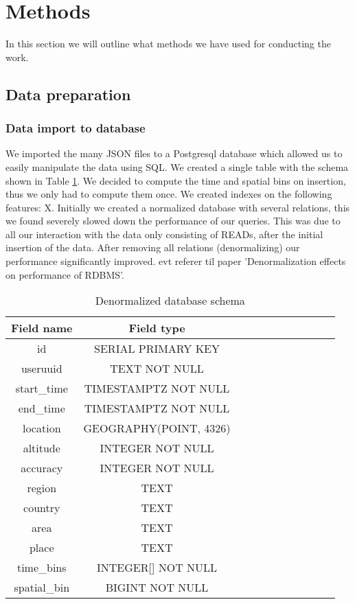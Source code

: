 \section{Methods}
In this section we will outline what methods we have used for conducting the work.
\subsection{Data preparation}
\subsubsection{Data import to database}
We imported the many JSON files to a Postgresql database which allowed us to easily manipulate the data using SQL. We created a single table with the schema shown in Table \ref{table:schema_denormalized}. We decided to compute the time and spatial bins on insertion, thus we only had to compute them once. We created indexes on the following features: X.
Initially we created a normalized database with several relations, this we found severely slowed down the performance of our queries. This was due to all our interaction with the data only consisting of READs, after the initial insertion of the data. After removing all relations (denormalizing) our performance significantly improved. {\color{red} evt referer til paper 'Denormalization effects on performance of RDBMS'}.
\begin{table}[htbp]
\centering

\begin{tabular}{|c|c|c|c|c|c|c|c|c|c|c|}
\hline
\textbf{Field name} & \textbf{Field type}    \\
\hline
id                  & SERIAL PRIMARY KEY     \\
\hline
useruuid            & TEXT NOT NULL          \\
\hline
start\_time         & TIMESTAMPTZ NOT NULL   \\
\hline
end\_time           & TIMESTAMPTZ NOT NULL   \\
\hline
location            & GEOGRAPHY(POINT, 4326) \\
\hline
altitude            & INTEGER NOT NULL       \\
\hline
accuracy            & INTEGER NOT NULL       \\
\hline
region              & TEXT                   \\
\hline
country             & TEXT                   \\
\hline
area                & TEXT                   \\
\hline
place               & TEXT                   \\
\hline
time\_bins          & INTEGER{[}{]} NOT NULL \\
\hline
spatial\_bin        & BIGINT NOT NULL        \\
\hline
\end{tabular}
\caption{Denormalized database schema}
\label{table:schema_denormalized}
\end{table}
